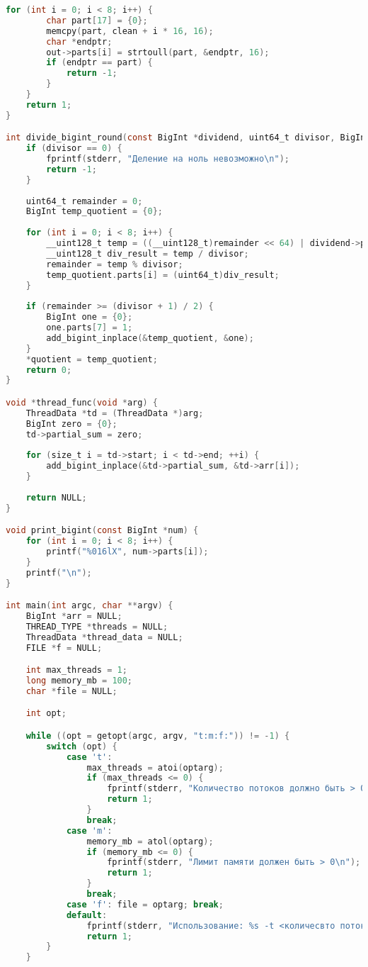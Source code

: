\documentclass[12pt,a4paper]{article}
\begin{document}
\begin{itemize}
\begin{lstlisting}[language=C,caption=Основная программа]
    for (int i = 0; i < 8; i++) {
        char part[17] = {0};
        memcpy(part, clean + i * 16, 16);
        char *endptr;
        out->parts[i] = strtoull(part, &endptr, 16);
        if (endptr == part) {
            return -1;
        }
    }
    return 1;
}

int divide_bigint_round(const BigInt *dividend, uint64_t divisor, BigInt *quotient) {
    if (divisor == 0) {
        fprintf(stderr, "Деление на ноль невозможно\n");
        return -1;
    }
    
    uint64_t remainder = 0;
    BigInt temp_quotient = {0};
    
    for (int i = 0; i < 8; i++) {
        __uint128_t temp = ((__uint128_t)remainder << 64) | dividend->parts[i];
        __uint128_t div_result = temp / divisor;
        remainder = temp % divisor;
        temp_quotient.parts[i] = (uint64_t)div_result;
    }
    
    if (remainder >= (divisor + 1) / 2) {
        BigInt one = {0};
        one.parts[7] = 1;
        add_bigint_inplace(&temp_quotient, &one);
    }
    *quotient = temp_quotient;
    return 0;
}

void *thread_func(void *arg) {
    ThreadData *td = (ThreadData *)arg;
    BigInt zero = {0};
    td->partial_sum = zero;
    
    for (size_t i = td->start; i < td->end; ++i) {
        add_bigint_inplace(&td->partial_sum, &td->arr[i]);
    }
    
    return NULL;
}

void print_bigint(const BigInt *num) {
    for (int i = 0; i < 8; i++) {
        printf("%016lX", num->parts[i]);
    }
    printf("\n");
}

int main(int argc, char **argv) {
    BigInt *arr = NULL;
    THREAD_TYPE *threads = NULL;
    ThreadData *thread_data = NULL;
    FILE *f = NULL;

    int max_threads = 1;
    long memory_mb = 100;
    char *file = NULL;

    int opt;

    while ((opt = getopt(argc, argv, "t:m:f:")) != -1) {
        switch (opt) {
            case 't': 
                max_threads = atoi(optarg); 
                if (max_threads <= 0) {
                    fprintf(stderr, "Количество потоков должно быть > 0\n");
                    return 1;
                }
                break;
            case 'm': 
                memory_mb = atol(optarg); 
                if (memory_mb <= 0) {
                    fprintf(stderr, "Лимит памяти должен быть > 0\n");
                    return 1;
                }
                break;
            case 'f': file = optarg; break;
            default:
                fprintf(stderr, "Использование: %s -t <количесвто потоков> -m <количество памяти> -f <имя файла>\n", argv[0]);
                return 1;
        }
    }
    

\end{lstlisting}
\end{itemize}
\end{document}
